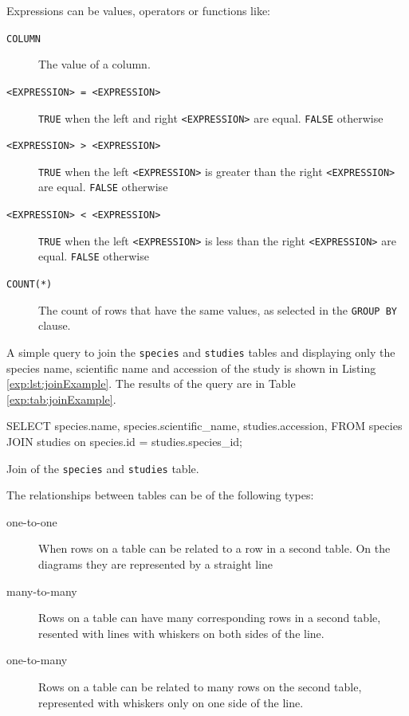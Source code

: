 Expressions can be values, operators or functions like:

\begin{description}
\item[\texttt{COLUMN}] The value of a column. 
\item[ \texttt{<EXPRESSION> = <EXPRESSION>}] \texttt{TRUE} when the left and right \texttt{<EXPRESSION>} are equal. \texttt{FALSE} otherwise 
\item[ \texttt{<EXPRESSION> > <EXPRESSION>}] \texttt{TRUE} when the left  \texttt{<EXPRESSION>} is greater than the  right \texttt{<EXPRESSION>} are equal. \texttt{FALSE} otherwise 
\item[ \texttt{<EXPRESSION> < <EXPRESSION>}] \texttt{TRUE} when the left  \texttt{<EXPRESSION>} is less than the  right \texttt{<EXPRESSION>} are equal. \texttt{FALSE} otherwise
\item[ \texttt{COUNT(*)}] The count of rows that have the same values, as selected in the \texttt{GROUP BY} clause.
\end{description}

A simple query to join the  \texttt{species} and \texttt{studies} tables and displaying only the species name, scientific name and accession of the study is shown in Listing \ref{exp:lst:joinExample}. 
The results of the query are in Table \ref{exp:tab:joinExample}. 

\begin{code}[language=sql, label=exp:lst:joinExample,caption=Join example query]
SELECT 
	species.name, 
	species.scientific_name, 
	studies.accession, 
FROM species
JOIN studies on species.id = studies.species_id;
\end{code}

\begin{table}[h!]

\caption[Join example]{Join of the \texttt{species} and \texttt{studies} table. }
\label{exp:tab:joinExample}
\centering

\end{table}


The relationships between tables can be of the following types:

\begin{description}
\item[one-to-one] When rows on a table can be related to a row in a second table. On the diagrams they are represented by a straight line
\item[many-to-many] Rows on a table can have many corresponding rows in a second table, resented with lines with whiskers on both sides of the line.  
\item[one-to-many] Rows on a table can be related to many rows on the second table, represented with whiskers only on one side of the line. 
\end{description}

